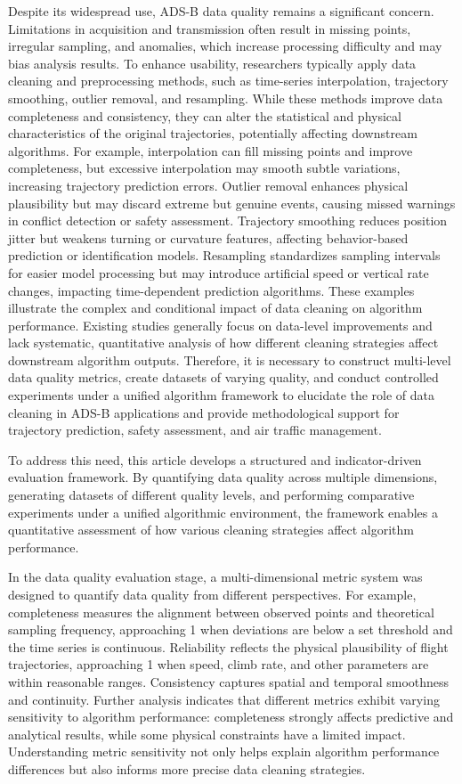 Despite its widespread use, ADS-B data quality remains a significant concern. Limitations in acquisition and transmission often result in missing points, irregular sampling, and anomalies, which increase processing difficulty and may bias analysis results. To enhance usability, researchers typically apply data cleaning and preprocessing methods, such as time-series interpolation, trajectory smoothing, outlier removal, and resampling. While these methods improve data completeness and consistency, they can alter the statistical and physical characteristics of the original trajectories, potentially affecting downstream algorithms. For example, interpolation can fill missing points and improve completeness, but excessive interpolation may smooth subtle variations, increasing trajectory prediction errors. Outlier removal enhances physical plausibility but may discard extreme but genuine events, causing missed warnings in conflict detection or safety assessment. Trajectory smoothing reduces position jitter but weakens turning or curvature features, affecting behavior-based prediction or identification models. Resampling standardizes sampling intervals for easier model processing but may introduce artificial speed or vertical rate changes, impacting time-dependent prediction algorithms. These examples illustrate the complex and conditional impact of data cleaning on algorithm performance. Existing studies generally focus on data-level improvements and lack systematic, quantitative analysis of how different cleaning strategies affect downstream algorithm outputs. Therefore, it is necessary to construct multi-level data quality metrics, create datasets of varying quality, and conduct controlled experiments under a unified algorithm framework to elucidate the role of data cleaning in ADS-B applications and provide methodological support for trajectory prediction, safety assessment, and air traffic management.

To address this need, this article develops a structured and indicator-driven evaluation framework. By quantifying data quality across multiple dimensions, generating datasets of different quality levels, and performing comparative experiments under a unified algorithmic environment, the framework enables a quantitative assessment of how various cleaning strategies affect algorithm performance.

In the data quality evaluation stage, a multi-dimensional metric system was designed to quantify data quality from different perspectives. For example, completeness measures the alignment between observed points and theoretical sampling frequency, approaching 1 when deviations are below a set threshold and the time series is continuous. Reliability reflects the physical plausibility of flight trajectories, approaching 1 when speed, climb rate, and other parameters are within reasonable ranges. Consistency captures spatial and temporal smoothness and continuity. Further analysis indicates that different metrics exhibit varying sensitivity to algorithm performance: completeness strongly affects predictive and analytical results, while some physical constraints have a limited impact. Understanding metric sensitivity not only helps explain algorithm performance differences but also informs more precise data cleaning strategies.

